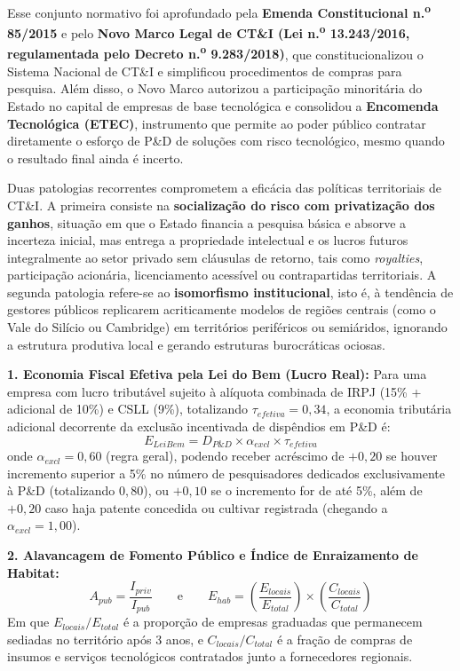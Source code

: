 Esse conjunto normativo foi aprofundado pela \textbf{Emenda Constitucional n.\textsuperscript{o} 85/2015} e pelo \textbf{Novo Marco Legal de CT\&I (Lei n.\textsuperscript{o} 13.243/2016, regulamentada pelo Decreto n.\textsuperscript{o} 9.283/2018)}, que constitucionalizou o Sistema Nacional de CT\&I e simplificou procedimentos de compras para pesquisa. Além disso, o Novo Marco autorizou a participação minoritária do Estado no capital de empresas de base tecnológica e consolidou a \textbf{Encomenda Tecnológica (ETEC)}, instrumento que permite ao poder público contratar diretamente o esforço de P\&D de soluções com risco tecnológico, mesmo quando o resultado final ainda é incerto.

\begin{boxConceito}
Duas patologias recorrentes comprometem a eficácia das políticas territoriais de CT\&I. A primeira consiste na \textbf{socialização do risco com privatização dos ganhos}, situação em que o Estado financia a pesquisa básica e absorve a incerteza inicial, mas entrega a propriedade intelectual e os lucros futuros integralmente ao setor privado sem cláusulas de retorno, tais como \textit{royalties}, participação acionária, licenciamento acessível ou contrapartidas territoriais. A segunda patologia refere-se ao \textbf{isomorfismo institucional}, isto é, à tendência de gestores públicos replicarem acriticamente modelos de regiões centrais (como o Vale do Silício ou Cambridge) em territórios periféricos ou semiáridos, ignorando a estrutura produtiva local e gerando estruturas burocráticas ociosas.
\end{boxConceito}

\begin{boxFormula}
\textbf{1. Economia Fiscal Efetiva pela Lei do Bem (Lucro Real):}
Para uma empresa com lucro tributável sujeito à alíquota combinada de IRPJ (15\% + adicional de 10\%) e CSLL (9\%), totalizando $\tau_{efetiva} = 0{,}34$, a economia tributária adicional decorrente da exclusão incentivada de dispêndios em P\&D é:
\[
E_{LeiBem} = D_{P\&D} \times \alpha_{excl} \times \tau_{efetiva}
\]
onde $\alpha_{excl} = 0{,}60$ (regra geral), podendo receber acréscimo de $+0{,}20$ se houver incremento superior a 5\% no número de pesquisadores dedicados exclusivamente à P\&D (totalizando $0{,}80$), ou $+0{,}10$ se o incremento for de até 5\%, além de $+0{,}20$ caso haja patente concedida ou cultivar registrada (chegando a $\alpha_{excl} = 1{,}00$).

\vspace{4pt}
\textbf{2. Alavancagem de Fomento Público e Índice de Enraizamento de Habitat:}
\[
A_{pub} = \frac{I_{priv}}{I_{pub}} \qquad \text{e} \qquad E_{hab} = \left(\frac{E_{locais}}{E_{total}}\right) \times \left(\frac{C_{locais}}{C_{total}}\right)
\]
Em que $E_{locais}/E_{total}$ é a proporção de empresas graduadas que permanecem sediadas no território após 3 anos, e $C_{locais}/C_{total}$ é a fração de compras de insumos e serviços tecnológicos contratados junto a fornecedores regionais.
\end{boxFormula}

